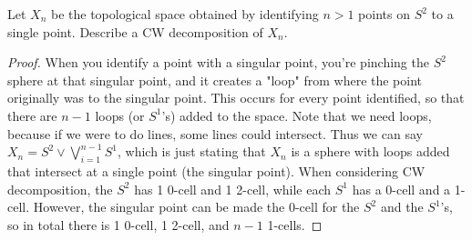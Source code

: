\documentclass[12pt]{article}
\newenvironment{statement}[2][Statement]{\begin{trivlist}
\item[\hskip \labelsep {\bfseries #1}\hskip \labelsep {\bfseries #2.}]}{\end{trivlist}}
\begin{document}
\begin{statement}[Exercise]{2}
    Let $X_n$ be the topological space obtained by identifying $n > 1$ points on $S^2$ to a single point. Describe a CW decomposition of $X_n$.
\end{statement}
\begin{proof}
    When you identify a point with a singular point, you're pinching the $S^2$ sphere at that singular point, and it creates a "loop" from where the point originally was to the singular point. This occurs for every point identified, so that there are $n-1$ loops (or $S^1$'s) added to the space. Note that we need loops, because if we were to do lines, some lines could intersect. Thus we can say $X_n = S^2 \vee \bigvee_{i=1}^{n-1} S^1$, which is just stating that $X_n$ is a sphere with loops added that intersect at a single point (the singular point). When considering CW decomposition, the $S^2$ has 1 0-cell and 1 2-cell, while each $S^1$ has a 0-cell and a 1-cell. However, the singular point can be made the 0-cell for the $S^2$ and the $S^1$'s, so in total there is 1 0-cell, 1 2-cell, and $n-1$ 1-cells. 
\end{proof}
\end{document}
